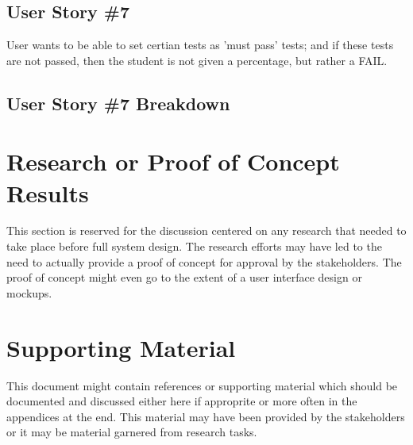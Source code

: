\subsection{User Story \#7}
User wants to be able to set certian tests as 'must pass' tests; and if these 
tests are not passed, then the student is not given a percentage, but rather a FAIL.

\subsection{User Story \#7 Breakdown}


\section{Research or Proof of Concept Results}
This section is reserved for the discussion centered on any research that needed 
to take place before full system design.  The research efforts may have led to 
the need to actually provide a proof of concept for approval by the stakeholders. 
 The proof of concept might even go to the extent of a user interface design or 
mockups.


\section{Supporting Material}
This document might contain references or supporting material which should be documented 
and discussed  either here if approprite or more often in the appendices at the end.  
This material may have been provided by the stakeholders  
or it may be material garnered from research tasks.
